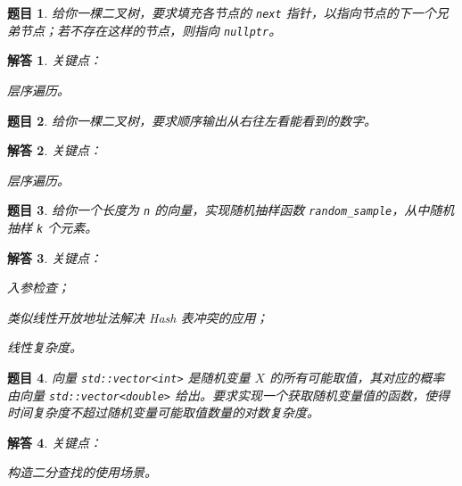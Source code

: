 \documentclass[UTF8, final]{ctexart}
\newtheorem{question}{题目}
\newtheorem{solution}{解答}
\begin{document}
\begin{question}
给你一棵二叉树，要求填充各节点的 \lstinline[style = lcpp]|next| 指针，以指向节点的下一个兄弟节点；若不存在这样的节点，则指向 \lstinline[style = lcpp]|nullptr|。
\end{question}
\begin{solution}
关键点：
\begin{compactitem}
    \item 层序遍历。
\end{compactitem}

\end{solution}


\begin{question}
给你一棵二叉树，要求顺序输出从右往左看能看到的数字。
\end{question}
\begin{solution}
关键点：
\begin{compactitem}
    \item 层序遍历。
\end{compactitem}

\end{solution}

\begin{question}
给你一个长度为 \lstinline[style = lcpp]|n| 的向量，实现随机抽样函数 \lstinline[style = lcpp]|random_sample|，从中随机抽样 \lstinline[style = lcpp]|k| 个元素。
\end{question}
\begin{solution}
关键点：
\begin{compactitem}
    \item 入参检查；
    \item 类似线性开放地址法解决 Hash 表冲突的应用；
    \item 线性复杂度。
\end{compactitem}

\end{solution}

\begin{question}
向量 \lstinline[style = lcpp]|std::vector<int>| 是随机变量 $X$ 的所有可能取值，其对应的概率由向量 \lstinline[style = lcpp]|std::vector<double>| 给出。要求实现一个获取随机变量值的函数，使得时间复杂度不超过随机变量可能取值数量的对数复杂度。
\end{question}
\begin{solution}
关键点：
\begin{compactitem}
  \item 构造二分查找的使用场景。
\end{compactitem}

\end{solution}
\end{document}
